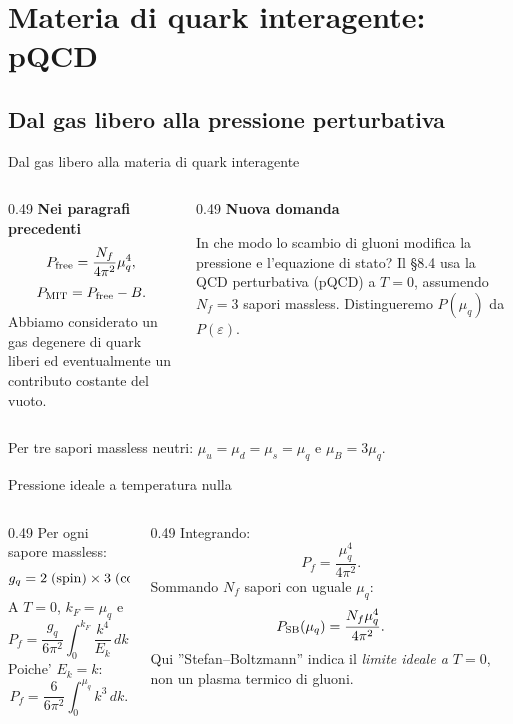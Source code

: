 \section{Materia di quark interagente: pQCD}

\subsection{Dal gas libero alla pressione perturbativa}

\begin{frame}{Dal gas libero alla materia di quark interagente}
\small
\begin{columns}[T,onlytextwidth]
\begin{column}{0.49\textwidth}
\textbf{Nei paragrafi precedenti}
\[
P_{\rm free}=\frac{N_f}{4\pi^2}\mu_q^4,
\]
\[
P_{\rm MIT}=P_{\rm free}-B.
\]
Abbiamo considerato un gas degenere di quark liberi
ed eventualmente un contributo costante del vuoto.
\end{column}
\begin{column}{0.49\textwidth}
\textbf{Nuova domanda}

In che modo lo scambio di gluoni modifica
la pressione e l'equazione di stato?
\medskip
Il \S8.4 usa la QCD perturbativa (pQCD)
a $T=0$, assumendo $N_f=3$ sapori massless.
\medskip
Distingueremo $P(\mu_q)$ da $P(\varepsilon)$.
\end{column}
\end{columns}
\medskip
Per tre sapori massless neutri: $\mu_u=\mu_d=\mu_s=\mu_q$ e
$\mu_B=3\mu_q$.
\end{frame}

\begin{frame}{Pressione ideale a temperatura nulla}
\small
\begin{columns}[T,onlytextwidth]
\begin{column}{0.49\textwidth}
Per ogni sapore massless:
\[
g_q=2\;({\rm spin})\times3\;({\rm colori})=6.
\]
A $T=0$, $k_F=\mu_q$ e
\[
P_f=\frac{g_q}{6\pi^2}
\int_0^{k_F}\frac{k^4}{E_k}\,dk.
\]
Poiche' $E_k=k$:
\[
P_f=\frac6{6\pi^2}\int_0^{\mu_q}k^3\,dk.
\]
\end{column}
\begin{column}{0.49\textwidth}
Integrando:
\[
P_f=\frac{\mu_q^4}{4\pi^2}.
\]
Sommando $N_f$ sapori con uguale $\mu_q$:
\[
P_{\rm SB}(\mu_q)=
\frac{N_f\mu_q^4}{4\pi^2}.
\]
Qui ''Stefan--Boltzmann'' indica
il \emph{limite ideale a $T=0$},
non un plasma termico di gluoni.
\end{column}
\end{columns}
\end{frame}

